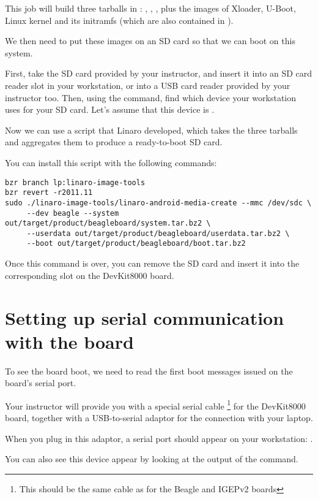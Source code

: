 This job will build three tarballs in
: ,
, , plus the images of
Xloader, U-Boot, Linux kernel and its initramfs (which are also
contained in ).

We then need to put these images on an SD card so that we can boot on
this system.

First, take the SD card provided by your instructor, and insert it
into an SD card reader slot in your workstation, or into a USB card
reader provided by your instructor too. Then, using the 
command, find which device your workstation uses for your SD card.
Let's assume that this device is .

Now we can use a  script that Linaro
developed, which takes the three tarballs and aggregates them to
produce a ready-to-boot SD card.

You can install this script with the following commands:

\begin{verbatim}
bzr branch lp:linaro-image-tools
bzr revert -r2011.11
sudo ./linaro-image-tools/linaro-android-media-create --mmc /dev/sdc \
     --dev beagle --system out/target/product/beagleboard/system.tar.bz2 \
     --userdata out/target/product/beagleboard/userdata.tar.bz2 \
     --boot out/target/product/beagleboard/boot.tar.bz2
\end{verbatim}

Once this command is over, you can remove the SD card and insert it
into the corresponding slot on the DevKit8000 board.

\section{Setting up serial communication with the board}

To see the board boot, we need to read the first boot messages issued
on the board's serial port.

Your instructor will provide you with a special serial cable
\footnote{This should be the same cable as for the Beagle and IGEPv2
  boards} for the DevKit8000 board, together with a USB-to-serial
adaptor for the connection with your laptop.

When you plug in this adaptor, a serial port should appear on your
workstation: \code{/dev/ttyUSB0}.

You can also see this device appear by looking at the output of the
\code{dmesg} command.

